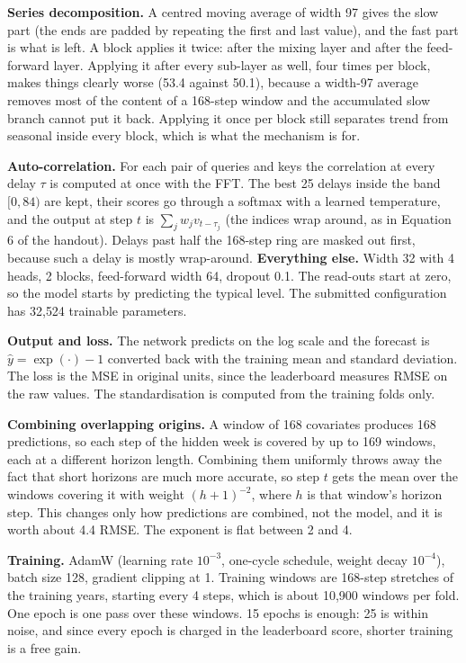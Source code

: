 \documentclass[11pt,letterpaper]{article}
\begin{document}
\textbf{Series decomposition.} A centred moving average of width 97 gives the slow part (the ends are padded by repeating the first and last value), and the fast part is what is left. A block applies it twice: after the mixing layer and after the feed-forward layer. Applying it after {every} sub-layer as well, four times per block, makes things clearly worse (53.4 against 50.1), because a width-97 average removes most of the content of a 168-step window and the accumulated slow branch cannot put it back. Applying it once per block still separates trend from seasonal inside every block, which is what the mechanism is for.

\textbf{Auto-correlation.} For each pair of queries and keys the correlation at every delay $\tau$ is computed at once with the FFT. The best 25 delays inside the band $[0,84)$ are kept, their scores go through a softmax with a learned temperature, and the output at step $t$ is $\sum_j w_j v_{t-\tau_j}$ (the indices wrap around, as in Equation 6 of the handout). Delays past half the 168-step ring are masked out first, because such a delay is mostly wrap-around.
\textbf{Everything else.} Width 32 with 4 heads, 2 blocks, feed-forward width 64, dropout 0.1. The read-outs start at zero, so the model starts by predicting the typical level. The submitted configuration has 32{,}524 trainable parameters.

\textbf{Output and loss.} The network predicts on the log scale and the forecast is $\hat y=\exp(\cdot)-1$ converted back with the training mean and standard deviation. The loss is the MSE {in original units}, since the leaderboard measures RMSE on the raw values. The standardisation is computed from the training folds only.

\textbf{Combining overlapping origins.} A window of 168 covariates produces 168 predictions, so each step of the hidden week is covered by up to 169 windows, each at a different horizon length. Combining them uniformly throws away the fact that short horizons are much more accurate, so step $t$ gets the mean over the windows covering it with weight $(h+1)^{-2}$, where $h$ is that window's horizon step. This changes only how predictions are combined, not the model, and it is worth about 4.4 RMSE. The exponent is flat between 2 and 4.

\textbf{Training.} AdamW (learning rate $10^{-3}$, one-cycle schedule, weight decay $10^{-4}$), batch size 128, gradient clipping at 1. Training windows are 168-step stretches of the training years, starting every 4 steps, which is about 10{,}900 windows per fold. One epoch is one pass over these windows. 15 epochs is enough: 25 is within noise, and since every epoch is charged in the leaderboard score, shorter training is a free gain.
\end{document}
